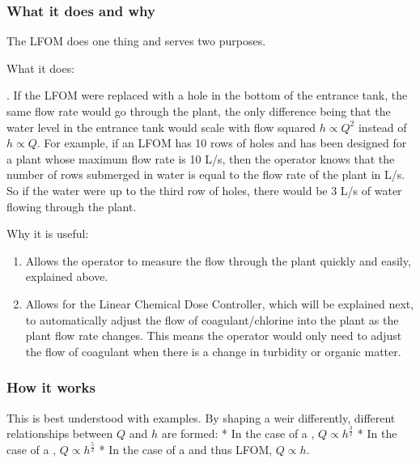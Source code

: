 \documentclass[letterpaper,10pt,english]{sphinxmanual}
\begin{document}
\subsubsection{What it does and why}
\label{\detokenize{Flow_Control_and_Measurement/FCM_Design:id6}}
The LFOM does one thing and serves two purposes.

What it does:

 . If the LFOM were replaced with a hole in the bottom of the entrance tank, the same flow rate would go through the plant, the only difference being that the water level in the entrance tank would scale with flow squared \(h \propto Q^2\) instead of \(h \propto Q\). For example, if an LFOM has 10 rows of holes and has been designed for a plant whose maximum flow rate is 10 L/s, then the operator knows that the number of rows submerged in water is equal to the flow rate of the plant in L/s. So if the water were up to the third row of holes, there would be 3 L/s of water flowing through the plant.

Why it is useful:
\begin{enumerate}
\item {} 
Allows the operator to measure the flow through the plant quickly and easily, explained above.

\item {} 
Allows for the Linear Chemical Dose Controller, which will be explained next, to automatically adjust the flow of coagulant/chlorine into the plant as the plant flow rate changes. This means the operator would only need to adjust the flow of coagulant when there is a change in turbidity or organic matter.

\end{enumerate}


\subsubsection{How it works}
\label{\detokenize{Flow_Control_and_Measurement/FCM_Design:id7}}
This is best understood with examples. By shaping a weir differently, different relationships between \(Q\) and \(h\) are formed:
* In the case of a , \(Q \propto h^{\frac{3}{2}}\)
* In the case of a , \(Q \propto h^{\frac{5}{2}}\)
* In the case of a  and thus LFOM, \(Q \propto h\).
\end{document}

